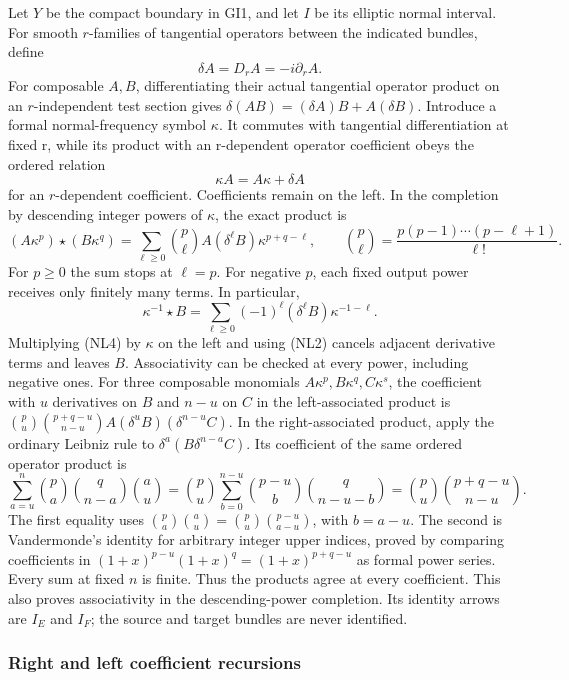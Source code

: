 \documentclass[
  11pt,
]{article}
\begin{document}
Let \(Y\) be the compact boundary in GI1, and let \(I\) be its elliptic
normal interval. For smooth \(r\)-families of tangential operators
between the indicated bundles, define \[
 \delta A=D_r A=-i\partial_r A.
 \tag{NL1}
\] For composable \(A,B\), differentiating their actual tangential
operator product on an \(r\)-independent test section gives
\(\delta(AB)=(\delta A)B+A(\delta B)\). Introduce a formal
normal-frequency symbol \(\kappa\). It commutes with tangential
differentiation at fixed r, while its product with an r-dependent
operator coefficient obeys the ordered relation \[
 \kappa A=A\kappa+\delta A
 \tag{NL2}
\] for an \(r\)-dependent coefficient. Coefficients remain on the left.
In the completion by descending integer powers of \(\kappa\), the exact
product is \[
 (A\kappa^p)\star(B\kappa^q)
 =\sum_{\ell\geq0}\binom p\ell A(\delta^\ell B)
                         \kappa^{p+q-\ell},
 \qquad
 \binom p\ell=\frac{p(p-1)\cdots(p-\ell+1)}{\ell!}.
 \tag{NL3}
\] For \(p\geq0\) the sum stops at \(\ell=p\). For negative \(p\), each
fixed output power receives only finitely many terms. In particular, \[
 \kappa^{-1}\star B
 =\sum_{\ell\geq0}(-1)^\ell(\delta^\ell B)\kappa^{-1-\ell}.
 \tag{NL4}
\] Multiplying (NL4) by \(\kappa\) on the left and using (NL2) cancels
adjacent derivative terms and leaves \(B\). Associativity can be checked
at every power, including negative ones. For three composable monomials
\(A\kappa^p,B\kappa^q,C\kappa^s\), the coefficient with \(u\)
derivatives on \(B\) and \(n-u\) on \(C\) in the left-associated product
is \(\binom pu\binom{p+q-u}{n-u}A(\delta^uB)(\delta^{n-u}C)\). In the
right-associated product, apply the ordinary Leibniz rule to
\(\delta^a(B\delta^{n-a}C)\). Its coefficient of the same ordered
operator product is \[
 \sum_{a=u}^{n}\binom pa\binom q{n-a}\binom au
 =\binom pu\sum_{b=0}^{n-u}\binom{p-u}b\binom q{n-u-b}
 =\binom pu\binom{p+q-u}{n-u}.
 \tag{NL4a}
\] The first equality uses
\(\binom pa\binom au=\binom pu\binom{p-u}{a-u}\), with \(b=a-u\). The
second is Vandermonde's identity for arbitrary integer upper indices,
proved by comparing coefficients in \((1+x)^{p-u}(1+x)^q=(1+x)^{p+q-u}\)
as formal power series. Every sum at fixed \(n\) is finite. Thus the
products agree at every coefficient. This also proves associativity in
the descending-power completion. Its identity arrows are \(I_E\) and
\(I_F\); the source and target bundles are never identified.

\subsubsection{Right and left coefficient
recursions}\label{right-and-left-coefficient-recursions}
\end{document}
